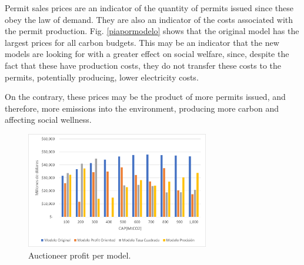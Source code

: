 \documentclass[a4paper,fleqn]{cas-dc}
\begin{document}
Permit sales prices are an indicator of the quantity of permits issued since these obey the law of demand. They are also an indicator of the costs associated with the permit production. Fig. \ref{piapormodelo} shows that the original model has the largest prices for all carbon budgets. This may be an indicator that the new models are looking for
with a greater effect on social welfare, since, despite the fact that these have production costs, they do not transfer these costs to the permits, potentially producing, lower electricity costs.

On the contrary, these prices may be the product of more permits issued, and therefore, more emissions into the environment, producing more carbon and affecting social wellness. 


\begin{figure}[h]
    \centering
    \includegraphics[width=8cm]{Submissions/EnergyPolicy/Images/utilidad de todos lo modelos.png}
\caption{{\footnotesize Auctioneer profit per model.}}
    \label{utilidades}
\end{figure}
\end{document}
